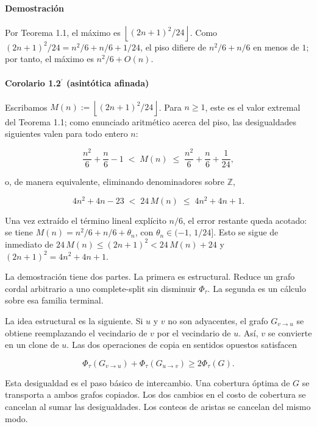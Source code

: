 \documentclass[spanish,11pt,a4paper]{article}
\begin{document}
\paragraph{Demostración}\label{demostraciuxf3n}

Por Teorema 1.1, el máximo es \(\left\lfloor(2n+1)^2/24\right\rfloor\).
Como \((2n+1)^2/24=n^2/6+n/6+1/24\), el piso difiere de \(n^2/6+n/6\) en
menos de \(1\); por tanto, el máximo es \(n^2/6+O(n)\).

\paragraph{\texorpdfstring{Corolario 1.2\(^{\prime}\) (asintótica
afinada)}{Corolario 1.2\^{}\{\textbackslash prime\} (asintótica afinada)}}\label{corolario-1.2prime-asintuxf3tica-afinada}

Escribamos \(M(n):=\left\lfloor(2n+1)^2/24\right\rfloor\). Para
\(n\ge1\), este es el valor extremal del Teorema 1.1; como enunciado
aritmético acerca del piso, las desigualdades siguientes valen para todo
entero \(n\):

\[
\frac{n^2}{6}+\frac{n}{6}-1
\;<\;
M(n)
\;\le\;
\frac{n^2}{6}+\frac{n}{6}+\frac{1}{24},
\]

o, de manera equivalente, eliminando denominadores sobre \(\mathbb Z\),

\[
4n^2+4n-23 \;<\; 24\,M(n) \;\le\; 4n^2+4n+1.
\]

Una vez extraído el término lineal explícito \(n/6\), el error restante
queda acotado: se tiene \(M(n)=n^2/6+n/6+\theta_n\), con
\(\theta_n\in(-1,\,1/24]\). Esto se sigue de inmediato de
\(24\,M(n)\le(2n+1)^2<24\,M(n)+24\) y \((2n+1)^2=4n^2+4n+1\).

La demostración tiene dos partes. La primera es estructural. Reduce un
grafo cordal arbitrario a uno complete-split sin disminuir
\(\Phi_\tau\). La segunda es un cálculo sobre esa familia terminal.

La idea estructural es la siguiente. Si \(u\) y \(v\) no son adyacentes,
el grafo \(G_{v\to u}\) se obtiene reemplazando el vecindario de \(v\)
por el vecindario de \(u\). Así, \(v\) se convierte en un clone de
\(u\). Las dos operaciones de copia en sentidos opuestos satisfacen

\[
\Phi_\tau(G_{v\to u})
+
\Phi_\tau(G_{u\to v})
\ge
2\Phi_\tau(G).
\]

Esta desigualdad es el paso básico de intercambio. Una cobertura óptima
de \(G\) se transporta a ambos grafos copiados. Los dos cambios en el
costo de cobertura se cancelan al sumar las desigualdades. Los conteos
de aristas se cancelan del mismo modo.
\end{document}
